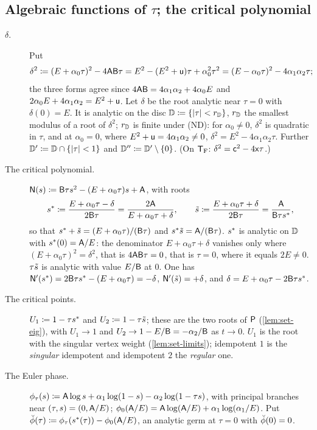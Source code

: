 \subsection{Algebraic functions of \texorpdfstring{$\tau$}{tau}; the critical polynomial}
\label{sec:set-alg}

\begin{defn}
\label{def:set-alg}
\begin{description}
\item[$\delta$.] Put
\[
\delta^2\coloneqq(E+\alpha_0\tau)^2-4\mathsf{A}\mathsf{B}\tau=E^2-(E^2+\mathsf{u})\tau+\alpha_0^2\tau^2=(E-\alpha_0\tau)^2-4\alpha_1\alpha_2\tau ;
\]
the three forms agree since $4\mathsf{A}\mathsf{B}=4\alpha_1\alpha_2+4\alpha_0E$ and $2\alpha_0E+4\alpha_1\alpha_2=E^2+\mathsf{u}$. Let $\delta$ be the root analytic near $\tau=0$ with $\delta(0)=E$. It is analytic on the disc $\mathbb{D}\coloneqq\{|\tau|<r_{\mathbb{D}}\}$, $r_{\mathbb{D}}$ the smallest modulus of a root of $\delta^2$; $r_{\mathbb{D}}$ is finite under (ND): for $\alpha_0\neq0$, $\delta^2$ is quadratic in $\tau$, and at $\alpha_0=0$, where $E^2+\mathsf{u}=4\alpha_1\alpha_2\neq0$, $\delta^2=E^2-4\alpha_1\alpha_2\tau$. Further $\mathbb{D}'\coloneqq\mathbb{D}\cap\{|\tau|<1\}$ and $\mathbb{D}''\coloneqq\mathbb{D}'\setminus\{0\}$. (On $\mathsf{T}_{\mathrm{F}}$: $\delta^2=\mathsf{c}^2-4\mathsf{x}\tau$.)
\item[The critical polynomial.] $\mathsf{N}(s)\coloneqq\mathsf{B}\tau s^2-(E+\alpha_0\tau)s+\mathsf{A}$, with roots
\[
s^{\ast}\coloneqq\frac{E+\alpha_0\tau-\delta}{2\mathsf{B}\tau}=\frac{2\mathsf{A}}{E+\alpha_0\tau+\delta},\qquad
\tilde{s}\coloneqq\frac{E+\alpha_0\tau+\delta}{2\mathsf{B}\tau}=\frac{\mathsf{A}}{\mathsf{B}\tau s^{\ast}},
\]
so that $s^{\ast}+\tilde{s}=(E+\alpha_0\tau)/(\mathsf{B}\tau)$ and $s^{\ast}\tilde{s}=\mathsf{A}/(\mathsf{B}\tau)$. $s^{\ast}$ is analytic on $\mathbb{D}$ with $s^{\ast}(0)=\mathsf{A}/E$: the denominator $E+\alpha_0\tau+\delta$ vanishes only where $(E+\alpha_0\tau)^2=\delta^2$, that is $4\mathsf{A}\mathsf{B}\tau=0$, that is $\tau=0$, where it equals $2E\neq0$. $\tau\tilde{s}$ is analytic with value $E/\mathsf{B}$ at $0$. One has $\mathsf{N}'(s^{\ast})=2\mathsf{B}\tau s^{\ast}-(E+\alpha_0\tau)=-\delta$, $\mathsf{N}'(\tilde{s})=+\delta$, and $\delta=E+\alpha_0\tau-2\mathsf{B}\tau s^{\ast}$.
\item[The critical points.] $U_1\coloneqq1-\tau s^{\ast}$ and $U_2\coloneqq1-\tau\tilde{s}$; these are the two roots of $\mathsf{P}$ (\cref{lem:set-eig}), with $U_1\to1$ and $U_2\to1-E/\mathsf{B}=-\alpha_2/\mathsf{B}$ as $t\to0$. $U_1$ is the root with the singular vertex weight (\cref{lem:set-limits}); idempotent $1$ is the \emph{singular} idempotent and idempotent $2$ the \emph{regular} one.
\item[The Euler phase.] $\phi_\tau(s)\coloneqq\mathsf{A}\log s+\alpha_1\log(1-s)-\alpha_2\log(1-\tau s)$, with principal branches near $(\tau,s)=(0,\mathsf{A}/E)$; $\phi_0(\mathsf{A}/E)=\mathsf{A}\log(\mathsf{A}/E)+\alpha_1\log(\alpha_1/E)$. Put $\breve{\phi}(\tau)\coloneqq\phi_\tau(s^{\ast}(\tau))-\phi_0(\mathsf{A}/E)$, an analytic germ at $\tau=0$ with $\breve{\phi}(0)=0$.
\end{description}
\end{defn}


